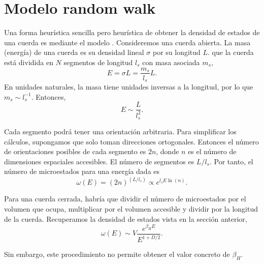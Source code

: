 \section{Modelo random walk}

Una forma heurística sencilla pero heurística de obtener la densidad de estados 
de una cuerda es mediante el modelo .
Consideremos una cuerda abierta. 
La masa (energía) de una cuerda es su densidad lineal $\sigma$ por su longitud $L$.
que la cuerda está dividida en $N$ segmentos de longitud $l_s$ con masa asociada $m_s$, 
\begin{equation}
  E = \sigma L  =  \frac{m_s}{l_s} L.
\end{equation}
En unidades naturales, la masa tiene unidades inversas a la longitud, por lo que $m_s\sim l_s^{-1}$.
Entonces,
\begin{equation}
  E \sim \frac{L}{l_s^2}.
\end{equation}

Cada segmento podrá tener una orientación arbitraria. Para simplificar los cálculos,
supongamos que solo toman direcciones ortogonales. Entonces el número de orientaciones posibles
de cada segmento es $2n$, donde $n$ es el número de dimensiones espaciales accesibles.
El número de segmentos es $L/l_s$.
Por tanto, el número de microestados para una energía dada es
\begin{equation}
  \omega(E)=(2n)^{(L/l_s)}\propto e^{l_s E \ln (n)}.
\end{equation}


Para una cuerda cerrada, habría que dividir el número de microestados por el 
volumen que ocupa, multiplicar por el volumen accesible y dividir por la longitud de la cuerda.
Recuperamos la densidad de estados vista en la sección anterior,
\begin{equation}
  \omega(E)\sim V \frac{e^{\beta_H E}}{E^{1+D/2}}.
\end{equation}

Sin embargo, este procedimiento no permite obtener el valor concreto de $\beta_H$.



